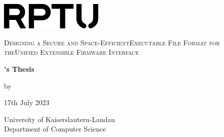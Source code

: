 \documentclass[
	bibliography=totoc, %
	listof=totoc,      %
	final              %
]{scrbook}              %
\begin{document}
\frontmatter


\begin{titlepage}
    \makeatletter
        \centering
        \includegraphics[width=5cm]{RPTU Logo_minimal_1cschwarz}\par\vspace*{\fill}
        {\scshape\huge\sffamily Designing a Secure and Space-Efficient\break Executable File Format for the\break Unified Extensible Firmware Interface\par}\vspace*{\fill}
        {\Large\bfseries \thesisType's Thesis\par} \vspace{1cm}
        {\Large by\par} \vspace{1cm}
        {\LARGE\@author\par}\vspace{1cm}
        {\Large 17th July 2023\par}\vspace*{\fill}
        {\Large University of Kaiserslautern-Landau\\
        \Large Department of Computer Science\par}
    \makeatother
\end{titlepage}
\restoregeometry

\end{document}
